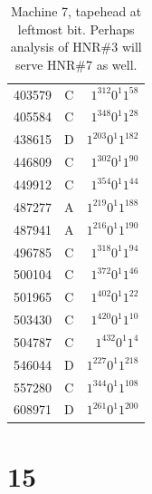 \documentclass[12pt]{article}
\begin{document}
\begin{small}
\begin{table}[H]
\begin{Parallel}[c]{0.48\textwidth}{0.48\textwidth}
{{\begin{tabular}{rcr}
403579&C&$1^{312}0^{1}1^{58}$\\
405584&C&$1^{348}0^{1}1^{28}$\\
438615&D&$1^{203}0^{1}1^{182}$\\
446809&C&$1^{302}0^{1}1^{90}$\\
449912&C&$1^{354}0^{1}1^{44}$\\
487277&A&$1^{219}0^{1}1^{188}$\\
487941&A&$1^{216}0^{1}1^{190}$\\
496785&C&$1^{318}0^{1}1^{94}$\\
500104&C&$1^{372}0^{1}1^{46}$\\
501965&C&$1^{402}0^{1}1^{22}$\\
503430&C&$1^{420}0^{1}1^{10}$\\
504787&C&$1^{432}0^{1}1^{4}$\\
546044&D&$1^{227}0^{1}1^{218}$\\
557280&C&$1^{344}0^{1}1^{108}$\\
608971&D&$1^{261}0^{1}1^{200}$\\
\end{tabular}}}
\end{Parallel}
\caption{\label{tab:7}Machine 7, tapehead at leftmost bit. Perhaps analysis of HNR\#3 will serve HNR\#7 as well.}
\end{table}
\end{small}

\clearpage
{}
{}
\section*{15}
\end{document}
